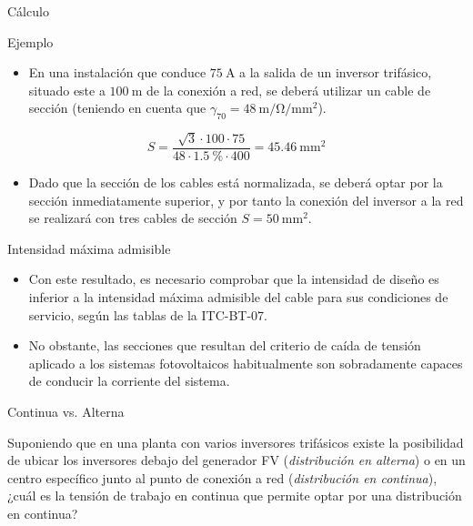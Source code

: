 \documentclass[xcolor={usenames,svgnames,dvipsnames}]{beamer}
\begin{document}
\begin{frame}[label={sec:org8baa113}]{Cálculo}
\begin{block}{Ejemplo}
\begin{itemize}
\item En una instalación que conduce \(\SI{75}{\ampere}\) a la salida de un
inversor trifásico, situado este a \(\SI{100}{\meter}\) de la conexión
a red, se deberá utilizar un cable de sección (teniendo en cuenta
que \(\gamma_{70} = \SI{48}{\meter\per\ohm\per\milli\meter\squared}\)).
\end{itemize}


\[
  S=\frac{\sqrt{3} \cdot 100 \cdot 75}{48 \cdot \SI{1.5}{\percent}\cdot400}=\SI{45.46}{\milli\meter\squared}
\]

\begin{itemize}
\item Dado que la sección de los cables está normalizada, se deberá optar
por la sección inmediatamente superior, y por tanto la conexión del
inversor a la red se realizará con tres cables de sección
\(S=\SI{50}{\milli\meter\squared}\).
\end{itemize}
\end{block}
\end{frame}

\begin{frame}[label={sec:org3cb030d}]{Intensidad máxima admisible}
\begin{itemize}
\item Con este resultado, es necesario comprobar que la intensidad de diseño es inferior a la intensidad máxima admisible del cable para sus condiciones de servicio, según las tablas de la ITC-BT-07.

\item No obstante, las secciones que resultan del criterio de caída de tensión aplicado a los sistemas fotovoltaicos habitualmente son sobradamente capaces de conducir la corriente del sistema.
\end{itemize}
\end{frame}

\begin{frame}[label={sec:orge3a50ea}]{Continua vs. Alterna}
\begin{block}{}
Suponiendo que en una planta con varios inversores trifásicos existe la
posibilidad de ubicar los inversores debajo del generador FV
(\emph{distribución en alterna}) o en un centro específico junto al punto de
conexión a red (\emph{distribución en continua}), \alert{¿cuál es la tensión de
trabajo en continua que permite optar por una distribución en continua?}
\end{block}
\end{frame}
\end{document}
